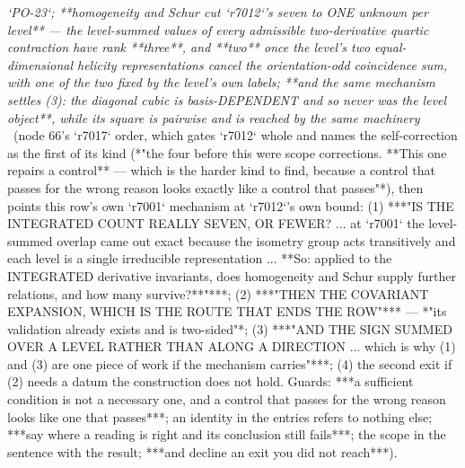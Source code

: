 \begin{description}
\textit{`PO-23`; **homogeneity and Schur cut `r7012`'s seven to ONE unknown per level** --- the level-summed values of every admissible two-derivative quartic contraction have rank **three**, and **two** once the level's two equal-dimensional helicity representations cancel the orientation-odd coincidence sum, with one of the two fixed by the level's own labels;  **and the same mechanism settles (3): the diagonal cubic is basis-DEPENDENT and so never was the level object**, while its square is pairwise and is reached by the same machinery} \ (node 66's `r7017` order, which gates `r7012` whole and names the self-correction as the first of its kind (*"the four before this were scope corrections. **This one repairs a control** --- which is the harder kind to find, because a control that passes for the wrong reason looks exactly like a control that passes"*), then points this row's own `r7001` mechanism at `r7012`'s own bound: (1) ***"IS THE INTEGRATED COUNT REALLY SEVEN, OR FEWER? ... at `r7001` the level-summed overlap came out exact because the isometry group acts transitively and each level is a single irreducible representation ... **So: applied to the INTEGRATED derivative invariants, does homogeneity and Schur supply further relations, and how many survive?**"***; (2) ***"THEN THE COVARIANT EXPANSION, WHICH IS THE ROUTE THAT ENDS THE ROW"*** --- *"its validation already exists and is two-sided"*; (3) ***"AND THE SIGN SUMMED OVER A LEVEL RATHER THAN ALONG A DIRECTION ... which is why (1) and (3) are one piece of work if the mechanism carries"***; (4) the second exit if (2) needs a datum the construction does not hold.  Guards: ***a sufficient condition is not a necessary one, and a control that passes for the wrong reason looks like one that passes***; an identity in the entries refers to nothing else; ***say where a reading is right and its conclusion still fails***; the scope in the sentence with the result; ***and decline an exit you did not reach***). 

\end{description}

